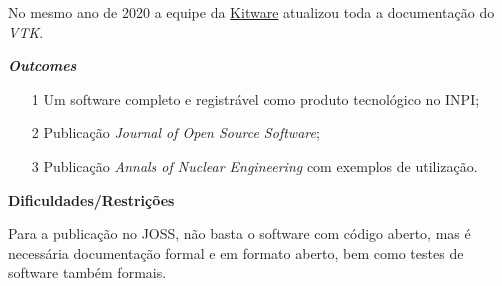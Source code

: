 No mesmo ano de 2020 a equipe da \href{https://vtk.org/}{Kitware} atualizou toda a documentação do \textit{VTK}.

\textbf{\textit{Outcomes}}

\begin{itemize}
	\item[1] Um software completo e registrável como produto tecnológico no 
INPI;
	\item[2] Publicação \textit{Journal of Open Source Software};
	\item[3] Publicação \textit{Annals of Nuclear Engineering} com exemplos de 
	utilização.
\end{itemize}

\textbf{Dificuldades/Restrições}

Para a publicação no JOSS, não basta o software com código aberto, mas é necessária 
documentação formal e em formato aberto, bem como testes de software também formais.\\

